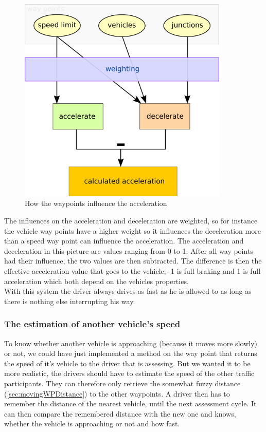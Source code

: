 \begin{figure}[H]
\begin{center}
\includegraphics[width=10cm]{images/animus.png}
\end{center}
\caption{How the waypoints influence the acceleration}
\label{fig:animus}
\end{figure}

The influences on the acceleration and deceleration are weighted, so for 
instance the vehicle way points have a higher weight so it influences the 
deceleration more than a speed way point can influence the acceleration.
The acceleration and deceleration in this picture are values ranging from
0 to 1. After all way points had their influence, the two values are then
subtracted. The difference is then the effective acceleration value that 
goes to the vehicle; -1 is full braking and 1 is full acceleration which
both depend on the vehicles properties. \\

With this system the driver always drives as fast as he is allowed to
as long as there is nothing else interrupting his way.


\subsubsection{The estimation of another vehicle's speed}

To know whether another vehicle is approaching (because it moves 
more slowly) or not, we could have just implemented a method on the
way point that returns the speed of it's vehicle to the driver that
is assessing. But we wanted it to be more realistic, the drivers should have
to estimate the speed of the other traffic participants. They can
therefore only retrieve the somewhat fuzzy distance (\ref{sec:movingWPDistance})
to the other waypoints. A driver then has to remember the distance
of the nearest vehicle, until the next assessment cycle. It can then
compare the remembered distance with the new one and knows, whether the
vehicle is approaching or not and how fast.

